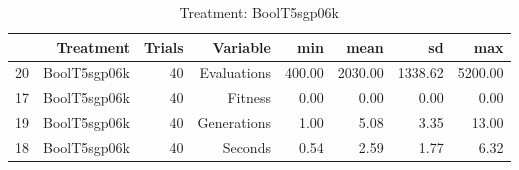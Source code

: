 \begin{table}[ht]
\centering
\begin{tabular}{rrrrrrrr}
  \hline
 & Treatment & Trials & Variable & min & mean & sd & max \\ 
  \hline
20 & BoolT5sgp06k &  40 & Evaluations & 400.00 & 2030.00 & 1338.62 & 5200.00 \\ 
  17 & BoolT5sgp06k &  40 & Fitness & 0.00 & 0.00 & 0.00 & 0.00 \\ 
  19 & BoolT5sgp06k &  40 & Generations & 1.00 & 5.08 & 3.35 & 13.00 \\ 
  18 & BoolT5sgp06k &  40 & Seconds & 0.54 & 2.59 & 1.77 & 6.32 \\ 
   \hline
\end{tabular}
\caption{Treatment: BoolT5sgp06k} 
\end{table}
